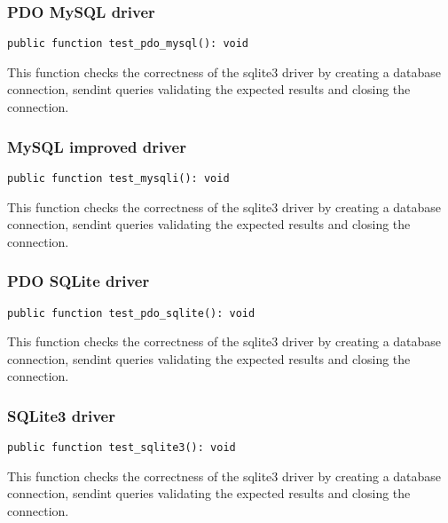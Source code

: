 \documentclass[a4paper]{article}
\begin{document}
\hypertarget{toc47}{}
\subsubsection{PDO MySQL driver}

\begin{lstlisting}
public function test_pdo_mysql(): void
\end{lstlisting}

This function checks the correctness of the sqlite3 driver by creating a
database connection, sendint queries validating the expected results and
closing the connection.

\hypertarget{toc48}{}
\subsubsection{MySQL improved driver}

\begin{lstlisting}
public function test_mysqli(): void
\end{lstlisting}

This function checks the correctness of the sqlite3 driver by creating a
database connection, sendint queries validating the expected results and
closing the connection.

\hypertarget{toc49}{}
\subsubsection{PDO SQLite driver}

\begin{lstlisting}
public function test_pdo_sqlite(): void
\end{lstlisting}

This function checks the correctness of the sqlite3 driver by creating a
database connection, sendint queries validating the expected results and
closing the connection.

\hypertarget{toc50}{}
\subsubsection{SQLite3 driver}

\begin{lstlisting}
public function test_sqlite3(): void
\end{lstlisting}

This function checks the correctness of the sqlite3 driver by creating a
database connection, sendint queries validating the expected results and
closing the connection.
\end{document}
